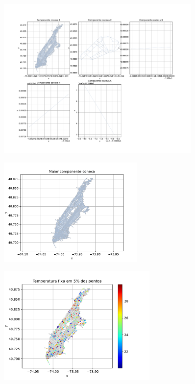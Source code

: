\documentclass{article}
\begin{document}
    \begin{figure}[ht]
        \centering
        \includegraphics[width=0.9\textwidth, trim={0 2.3cm 0 3.1cm},clip]{../figs/fig2.pdf}
    \end{figure}

    \vspace{3cm}

    \begin{figure}[ht]
        \centering
        \includegraphics[width=0.64\textwidth, trim={0 10px 0 25px},clip]{../figs/fig3.pdf}
    \end{figure}

    \newpage

    \begin{figure}[ht]
        \centering
        \includegraphics[width=0.7\textwidth, trim={0 10px 0 25px},clip]{../figs/fig4.pdf}
    \end{figure}
\end{document}
